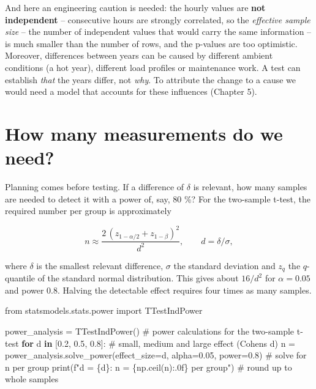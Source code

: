 \documentclass[
  letterpaper,
  DIV=11,
  numbers=noendperiod]{scrreprt}
\newenvironment{Shaded}{\begin{snugshade}}{\end{snugshade}}
\newcommand{\BuiltInTok}[1]{\textcolor[rgb]{0.00,0.23,0.31}{#1}}
\newcommand{\CommentTok}[1]{\textcolor[rgb]{0.37,0.37,0.37}{#1}}
\newcommand{\ControlFlowTok}[1]{\textcolor[rgb]{0.00,0.23,0.31}{\textbf{#1}}}
\newcommand{\FloatTok}[1]{\textcolor[rgb]{0.68,0.00,0.00}{#1}}
\newcommand{\ImportTok}[1]{\textcolor[rgb]{0.00,0.46,0.62}{#1}}
\newcommand{\KeywordTok}[1]{\textcolor[rgb]{0.00,0.23,0.31}{\textbf{#1}}}
\newcommand{\NormalTok}[1]{\textcolor[rgb]{0.00,0.23,0.31}{#1}}
\newcommand{\OperatorTok}[1]{\textcolor[rgb]{0.37,0.37,0.37}{#1}}
\newcommand{\SpecialCharTok}[1]{\textcolor[rgb]{0.37,0.37,0.37}{#1}}
\newcommand{\SpecialStringTok}[1]{\textcolor[rgb]{0.13,0.47,0.30}{#1}}
\begin{document}
And here an engineering caution is needed: the hourly values are
\textbf{not independent} -- consecutive hours are strongly correlated,
so the \emph{effective sample size} -- the number of independent values
that would carry the same information -- is much smaller than the number
of rows, and the p-values are too optimistic. Moreover, differences
between years can be caused by different ambient conditions (a hot
year), different load profiles or maintenance work. A test can establish
\emph{that} the years differ, not \emph{why}. To attribute the change to
a cause we would need a model that accounts for these influences
(Chapter 5).

\section{How many measurements do we
need?}\label{how-many-measurements-do-we-need}

Planning comes before testing. If a difference of \(\delta\) is
relevant, how many samples are needed to detect it with a power of, say,
80 \%? For the two-sample t-test, the required number per group is
approximately

\[n \approx \frac{2\,(z_{1-\alpha/2} + z_{1-\beta})^2}{d^2}, \qquad d = \delta/\sigma,\]

where \(\delta\) is the smallest relevant difference, \(\sigma\) the
standard deviation and \(z_q\) the \(q\)-quantile of the standard normal
distribution. This gives about \(16/d^2\) for \(\alpha = 0.05\) and
power 0.8. Halving the detectable effect requires four times as many
samples.

\begin{Shaded}
\begin{Highlighting}[]
\ImportTok{from}\NormalTok{ statsmodels.stats.power }\ImportTok{import}\NormalTok{ TTestIndPower}

\NormalTok{power\_analysis }\OperatorTok{=}\NormalTok{ TTestIndPower()                   }\CommentTok{\# power calculations for the two{-}sample t{-}test}
\ControlFlowTok{for}\NormalTok{ d }\KeywordTok{in}\NormalTok{ [}\FloatTok{0.2}\NormalTok{, }\FloatTok{0.5}\NormalTok{, }\FloatTok{0.8}\NormalTok{]:                          }\CommentTok{\# small, medium and large effect (Cohen\textquotesingle{}s d)}
\NormalTok{    n }\OperatorTok{=}\NormalTok{ power\_analysis.solve\_power(effect\_size}\OperatorTok{=}\NormalTok{d, alpha}\OperatorTok{=}\FloatTok{0.05}\NormalTok{, power}\OperatorTok{=}\FloatTok{0.8}\NormalTok{)  }\CommentTok{\# solve for n per group}
    \BuiltInTok{print}\NormalTok{(}\SpecialStringTok{f"d = }\SpecialCharTok{\{}\NormalTok{d}\SpecialCharTok{\}}\SpecialStringTok{: n = }\SpecialCharTok{\{}\NormalTok{np}\SpecialCharTok{.}\NormalTok{ceil(n)}\SpecialCharTok{:.0f\}}\SpecialStringTok{ per group"}\NormalTok{)                      }\CommentTok{\# round up to whole samples}
\end{Highlighting}
\end{Shaded}
\end{document}
